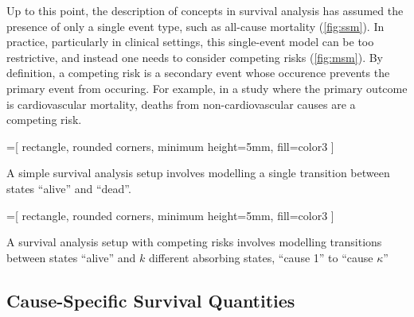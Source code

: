 Up to this point, the description of concepts in survival analysis has
assumed the presence of only a single event type, such as all-cause mortality
(\cref{fig:ssm}).
In practice, particularly in clinical settings, 
this single-event model can be too restrictive,
and instead one needs to consider competing risks
(\cref{fig:msm}).
By definition, a competing risk is a secondary event whose occurence 
prevents the primary event from occuring.
For example,
in a study where the primary outcome is cardiovascular mortality,
deaths from non-cardiovascular causes are a competing risk.

\begin{marginfigure}[-10em]%
    =[%
        rectangle, rounded corners, minimum height=5mm, fill=color3
    ]
    \centering
    \caption[Single-state survival model]{
        A simple survival analysis setup 
        involves modelling a single transition between states 
        \enquote{alive} and \enquote{dead}.
    }
    \label{fig:ssm}
\end{marginfigure}%

\begin{marginfigure}[0em]%
    =[%
        rectangle, rounded corners, minimum height=5mm, fill=color3
    ]
    \centering
    \caption[Multi-state survival model]{
        A survival analysis setup with competing risks
        involves modelling transitions between states 
        \enquote{alive} and \(k\) different absorbing
        states, \enquote{cause 1} to \enquote{cause \(\kappa\)}
    }
    \label{fig:msm}
\end{marginfigure}%

\subsection{Cause-Specific Survival Quantities}

